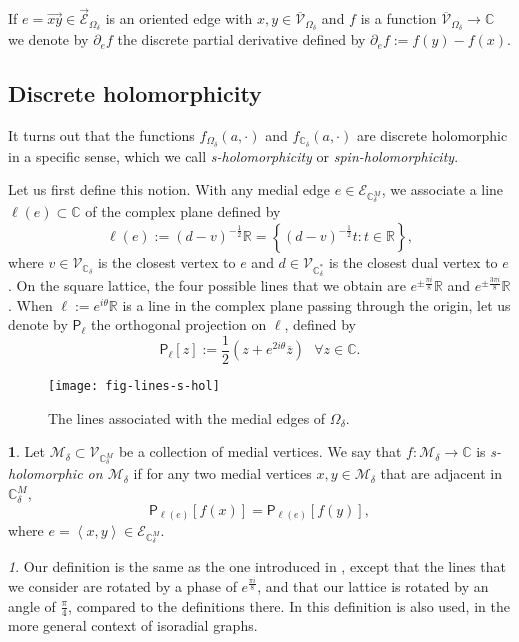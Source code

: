 \documentclass[oneside,english]{amsart}
\numberwithin{equation}{section}
\numberwithin{figure}{section}
\theoremstyle{plain}
\theoremstyle{plain}
\theoremstyle{plain}
\theoremstyle{plain}
\theoremstyle{plain}
\theoremstyle{definition}
\newtheorem{defn}[thm]{\protect\definitionname}
\theoremstyle{remark}
\newtheorem{rem}[thm]{\protect\remarkname}
\providecommand{\definitionname}{Definition}
\providecommand{\remarkname}{Remark}
\begin{document}
If $e=\vec{xy}\in\vec{\mathcal{E}}_{\Omega_{\delta}}$ is an oriented
edge with $x,y\in\overline{\mathcal{V}}_{\Omega_{\delta}}$ and $f$
is a function $\overline{\mathcal{V}}_{\Omega_{\delta}}\to\mathbb{C}$
we denote by $\partial_{e}f$ the discrete partial derivative defined
by $\partial_{e}f:=f\left(y\right)-f\left(x\right)$. 


\subsection{Discrete holomorphicity}

It turns out that the functions $f_{\Omega_{\delta}}\left(a,\cdot\right)$
and $f_{\mathbb{C}_{\delta}}\left(a,\cdot\right)$ are discrete holomorphic
in a specific sense, which we call \emph{s-holomorphicity} or \emph{spin-holomorphicity}. 

Let us first define this notion. With any medial edge $e\in\mathcal{E}_{\mathbb{C}_{\delta}^{M}}$,
we associate a line $\ell\left(e\right)\subset\mathbb{C}$ of the
complex plane defined by
\[
\ell\left(e\right):=\left(d-v\right)^{-\frac{1}{2}}\mathbb{R}=\left\{ \left(d-v\right)^{-\frac{1}{2}}t:t\in\mathbb{R}\right\} ,
\]
where $v\in\mathcal{V}_{\mathbb{C}_{\delta}}$ is the closest vertex
to $e$ and $d\in\mathcal{V}_{\mathbb{C}_{\delta}^{*}}$ is the closest
dual vertex to $e$. On the square lattice, the four possible lines
that we obtain are $e^{\pm\frac{\pi i}{8}}\mathbb{R}$ and $e^{\pm\frac{3\pi i}{8}}\mathbb{R}$.
When $\ell:=e^{i\theta}\mathbb{R}$ is a line in the complex plane
passing through the origin, let us denote by $\mathsf{P}_{\ell}$
the orthogonal projection on $\ell$, defined by 
\[
\mathsf{P}_{\ell}\left[z\right]:=\frac{1}{2}\left(z+e^{2i\theta}\overline{z}\right)\,\,\,\,\forall z\in\mathbb{C}.
\]


\begin{figure}
\texttt{[image: fig-lines-s-hol]}

\caption{The lines associated with the medial edges of $\Omega_{\delta}$.}
\end{figure}

\begin{defn}
\label{def:s-hol}Let $\mathcal{M}_{\delta}\subset\mathcal{V}_{\mathbb{C}_{\delta}^{M}}$
be a collection of medial vertices. We say that $f:\mathcal{M}_{\delta}\to\mathbb{C}$
is \emph{s-holomorphic on $\mathcal{M}_{\delta}$} if for any two
medial vertices $x,y\in\mathcal{M}_{\delta}$ that are adjacent in
$\mathbb{C}_{\delta}^{M}$,
\[
\mathsf{P}_{\ell\left(e\right)}\left[f\left(x\right)\right]=\mathsf{P}_{\ell\left(e\right)}\left[f\left(y\right)\right],
\]
where $e=\left\langle x,y\right\rangle \in\mathcal{E}_{\mathbb{C}_{\delta}^{M}}$. \end{defn}
\begin{rem}
Our definition is the same as the one introduced in \cite{smirnov-ii},
except that the lines that we consider are rotated by a phase of $e^{\frac{\pi i}{8}}$,
and that our lattice is rotated by an angle of $\frac{\pi}{4}$, compared
to the definitions there. In \cite{chelkak-smirnov-ii} this definition
is also used, in the more general context of isoradial graphs. 
\end{rem}
\end{document}
